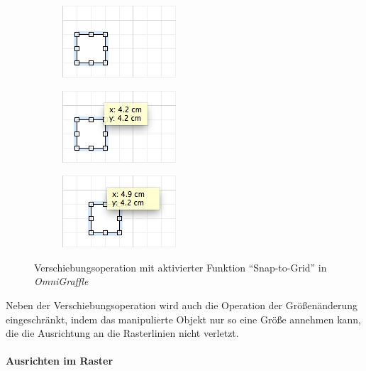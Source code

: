 \begin{figure}[hbt]
    \newcommand{\subfigurewidth}{0.33\textwidth}
    \newcommand{\graphicswidth}{0.95\linewidth}
    \begin{subfigure}{\subfigurewidth}
        \centering
        \includegraphics[width=\graphicswidth]{resources/omnigraffle-snap-to-grid-on-a}
        \caption{}
    \end{subfigure}
    \begin{subfigure}{\subfigurewidth}
        \centering
        \includegraphics[width=\graphicswidth]{resources/omnigraffle-snap-to-grid-on-b}
        \caption{}
    \end{subfigure}
    \begin{subfigure}{\subfigurewidth}
        \centering
        \includegraphics[width=\graphicswidth]{resources/omnigraffle-snap-to-grid-on-c}
        \caption{}
    \end{subfigure}
    \caption{Verschiebungsoperation mit aktivierter Funktion \enquote{Snap-to-Grid} in \textit{OmniGraffle}}
    \label{fig:omnigraffle-snap-to-grid-on}
\end{figure}

Neben der Verschiebungsoperation wird auch die Operation der Größenänderung eingeschränkt, indem das manipulierte Objekt nur so eine Größe annehmen kann, die die Ausrichtung an die Rasterlinien nicht verletzt.

\paragraph{Ausrichten im Raster}


